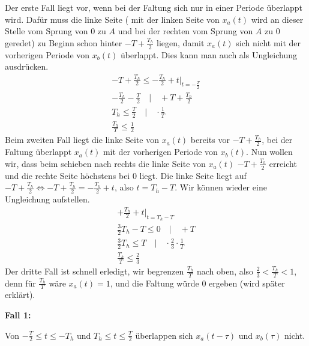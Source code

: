 \documentclass[11pt,a4paper,DIV=12]{scrartcl}
\begin{document}
Der erste Fall liegt vor, wenn bei der Faltung sich nur in einer Periode überlappt wird.
%
Dafür muss die linke Seite ( mit der linken Seite von $x_{a}(t)$ wird an dieser Stelle vom Sprung von $0$ zu $A$ und bei der rechten vom Sprung von $A$ zu $0$ geredet) zu Beginn schon hinter $-T+\frac{T_h}{2}$ liegen, damit $x_a(t)$ sich nicht mit der vorherigen Periode von $x_b(t)$ überlappt.
%
Dies kann man auch als Ungleichung ausdrücken.
%
%
\begin{gather}
	-T+\frac{T_h}{2}\leq -\frac{T_h}{2}+t\Bigg |_{t=-\frac{T}{2}}\nonumber\\
	-\frac{T_h}{2}-\frac{T}{2}\quad\Bigg |\quad +T+\frac{T_h}{2}\nonumber \\
	T_h\leq \frac{T}{2}\quad\Bigg |\quad \cdot\frac{1}{T}\nonumber \\
	\frac{T_h}{T}\leq\frac{1}{2}
\end{gather}
%
%
Beim zweiten Fall liegt die linke Seite von $x_{a}(t)$ bereits vor
$-T+\frac{T_h}{2}$, bei der Faltung überlappt $x_{a}(t)$ mit der vorherigen
Periode von $x_b(t)$.
%
Nun wollen wir, dass beim schieben nach rechts die linke Seite von $x_{a}(t)$
$-T+\frac{T_h}{2}$ erreicht und die rechte Seite höchstens bei $0$ liegt.
%
Die linke Seite liegt auf $-T+\frac{T_h}{2} \Leftrightarrow
-T+\frac{T_h}{2}=-\frac{T_h}{2}+t$, also $t=T_h-T$. Wir können wieder eine
Ungleichung aufstellen.
%
%
%
\begin{gather}
	+\frac{T_h}{2}+t\Bigg |_{t=T_h-T}\nonumber\\
	\frac{3}{2}T_h-T\leq 0\quad\Bigg |\quad+T\nonumber \\
	\frac{3}{2}T_h\leq T\quad\Bigg | \quad\cdot\frac{2}{3}\cdot\frac{1}{T}\nonumber\\
	\frac{T_h}{T}\leq \frac{2}{3}
\end{gather}
%
%
%
Der dritte Fall ist schnell erledigt, wir begrenzen $\frac{T_h}{T}$ nach oben,
also $\frac{2}{3}<\frac{T_h}{T}<1$, denn für $\frac{T_h}{T}$ wäre $x_a(t)=1$,
und die Faltung würde $0$ ergeben (wird später erklärt).

\textbf{Fall 1:}

Von $-\frac{T}{2}\leq t \leq -T_h$ und $T_h \leq t \leq \frac{T}{2}$ überlappen
sich $x_{a}(t-\tau)$ und $x_{b}(\tau)$ nicht.
\end{document}
